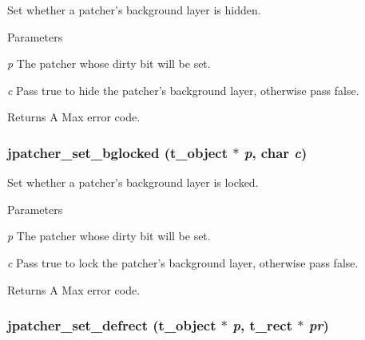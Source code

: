 Set whether a patcher's background layer is hidden. 
\begin{DoxyParams}{Parameters}
\item[{\em p}]The patcher whose dirty bit will be set. \item[{\em c}]Pass true to hide the patcher's background layer, otherwise pass false. \end{DoxyParams}
\begin{DoxyReturn}{Returns}
A Max error code. 
\end{DoxyReturn}
\hypertarget{group__jpatcher_ga8bdd915ec7c3de07c7c90c33b6b516bf}{
\subsubsection[{jpatcher\_\-set\_\-bglocked}]{ jpatcher\_\-set\_\-bglocked ({\bf t\_\-object} $\ast$ {\em p}, \/  char {\em c})}}
\label{group__jpatcher_ga8bdd915ec7c3de07c7c90c33b6b516bf}


Set whether a patcher's background layer is locked. 
\begin{DoxyParams}{Parameters}
\item[{\em p}]The patcher whose dirty bit will be set. \item[{\em c}]Pass true to lock the patcher's background layer, otherwise pass false. \end{DoxyParams}
\begin{DoxyReturn}{Returns}
A Max error code. 
\end{DoxyReturn}
\hypertarget{group__jpatcher_gacc68e225735eac71aecfc69808bf0697}{
\subsubsection[{jpatcher\_\-set\_\-defrect}]{ jpatcher\_\-set\_\-defrect ({\bf t\_\-object} $\ast$ {\em p}, \/  {\bf t\_\-rect} $\ast$ {\em pr})}}
\label{group__jpatcher_gacc68e225735eac71aecfc69808bf0697}


